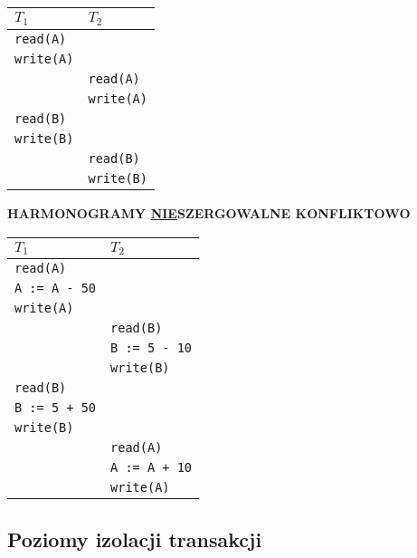 \begin{center}
    \begin{tabular}{|p{4cm}|p{4cm}|}
        \hline
        \textbf{$T_1$} & \textbf{$T_2$} \\
        \hline
        \texttt{read(A)} & \texttt{}\\
        \texttt{write(A)} & \texttt{}\\
        \texttt{} & \texttt{read(A)}\\
        \texttt{} & \texttt{write(A)}\\
        \texttt{read(B)} & \texttt{}\\
        \texttt{write(B)} & \texttt{}\\
        \texttt{} & \texttt{read(B)}\\
        \texttt{} & \texttt{write(B)}\\
        \hline
    \end{tabular}
\end{center}

\textbf{HARMONOGRAMY \underline{NIE}SZERGOWALNE KONFLIKTOWO}

\begin{center}
    \begin{tabular}{|p{4cm}|p{4cm}|}
        \hline
        \textbf{$T_1$} & \textbf{$T_2$} \\
        \hline
        \texttt{read(A)} & \texttt{}\\
        \texttt{A := A - 50} & \texttt{}\\
        \texttt{write(A)} & \texttt{}\\
        \texttt{} & \texttt{read(B)}\\
        \texttt{} & \texttt{B := 5 - 10}\\
        \texttt{} & \texttt{write(B)}\\
        \texttt{read(B)} & \texttt{}\\
        \texttt{B := 5 + 50} & \texttt{}\\
        \texttt{write(B)} & \texttt{}\\
        \texttt{} & \texttt{read(A)}\\
        \texttt{} & \texttt{A := A + 10}\\
        \texttt{} & \texttt{write(A)}\\
        \hline
    \end{tabular}
\end{center}

\pagebreak

\subsection{Poziomy izolacji transakcji}
\label{subsec:poziomy_izolacji_transakcji}

